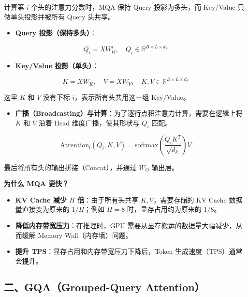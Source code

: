 计算第 \(i\) 个头的注意力分数时，MQA 保持 Query 投影为多头，而 Key/Value 只做单头投影并被所有 Query 头共享。

\begin{itemize}
\tightlist
\item
  \textbf{Query 投影（保持多头）}：
\end{itemize}

\[
Q_i = XW_Q^i, \quad Q_i \in \mathbb{R}^{B \times L \times d_k}
\]

\begin{itemize}
\tightlist
\item
  \textbf{Key/Value 投影（单头）}：
\end{itemize}

\[
K = XW_K, \quad V = XW_V, \quad K,V \in \mathbb{R}^{B \times L \times d_k}
\]

这里 \(K\) 和 \(V\) 没有下标 \(i\)，表示所有头共用这一组 Key/Value。

\begin{itemize}
\tightlist
\item
  \textbf{广播（Broadcasting）与计算}：为了逐行点积注意力计算，需要在逻辑上将 \(K\) 和 \(V\) 沿着 Head 维度广播，使其形状与 \(Q_i\) 匹配。
\end{itemize}

\[
\mathrm{Attention}_i(Q_i,K,V)=\mathrm{softmax}\left(\frac{Q_iK^T}{\sqrt{d_k}}\right)V
\]

最后将所有头的输出拼接（Concat），并通过 \(W_O\) 输出层。

\textbf{为什么 MQA 更快？}

\begin{itemize}
\tightlist
\item
  \textbf{KV Cache 减少 \(H\) 倍}：由于所有头共享 \(K,V\)，需要存储的 KV Cache 数据量直接变为原来的 \(1/H\)；例如 \(H=8\) 时，显存占用约为原来的 \(1/8\)。
\item
  \textbf{降低内存带宽压力}：在推理时，GPU 需要从显存搬运的数据量大幅减少，从而缓解 Memory Wall（内存墙）问题。
\item
  \textbf{提升 TPS}：显存占用和内存带宽压力下降后，Token 生成速度（TPS）通常会提升。
\end{itemize}

\hypertarget{ux4e8cgqagrouped-query-attention}{%
\subsection{二、GQA（Grouped-Query Attention）}\label{ux4e8cgqagrouped-query-attention}}

